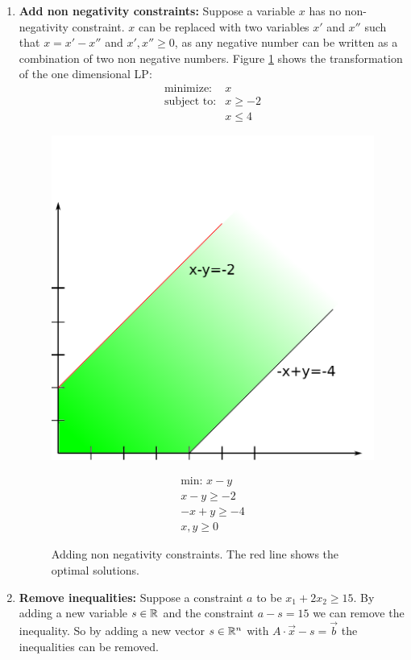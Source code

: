 \begin{enumerate}
\item {\bfseries Add non negativity constraints:} Suppose a variable $x$ has no non-negativity constraint. $x$ can be replaced with two variables $x'$ and $x''$ such that $x=x'-x''$ and $x',x''\geq 0$, as any negative number can be written as a combination of two non negative numbers. Figure \ref{Fig:1dTo2d} shows the transformation of the one dimensional LP:
\begin{eqnarray*}
\text{minimize:}& x \\
\text{subject to:} & x \geq -2\\
& x \leq 4
\end{eqnarray*}

\begin{figure}[hbt]
\begin{minipage}[hbt]{0.4\linewidth}
\includegraphics[width=1\textwidth]{./images/1dTo2d.pdf}
\end{minipage}
\hfill
\begin{minipage}[hbt]{0.4\linewidth}
\begin{align*}
\text{min: } x-y\\
x-y \geq -2\\
-x+y \geq -4\\
x,y \geq 0
\end{align*}

\end{minipage}
\caption{Adding non negativity constraints. The red line shows the optimal solutions.}
\label{Fig:1dTo2d}
\end{figure}

\item {\bfseries Remove inequalities:} Suppose a constraint $a$ to be $x_1+2x_2 \geq 15$. By adding a new variable $s\in \mathbb{R}$ and the constraint $a-s=15$ we can remove the inequality. So by adding a new vector $s\in \mathbb{R}^n$ with $A \cdot \vec x - s = \vec b$ the inequalities can be removed.
\end{enumerate}

